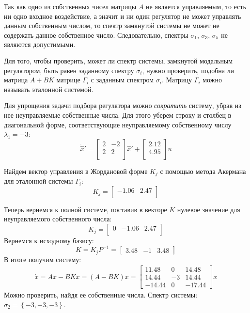 Так как одно из собственных чисел матрицы $A$ не является управляемым, то есть ни одно входное воздействие, а значит и ни один регулятор 
не может управлять данным собственным числом, то спектр замкнутой системы не может не содержать данное собственное число. 
Следовательно, спектры $\sigma_1$, $\sigma_3$, $\sigma_5$ не являются допустимыми.

Для того, чтобы проверить, может ли спектр системы, замкнутой модальным регулятором, быть равен заданному спектру $\sigma_i$, 
нужно проверить, подобна ли матрица $A + BK$ матрице $\Gamma_i$ с заданным спектром $\sigma_i$.
Матрицу $\Gamma_i$ можно называть эталонной системой.

Для упрощения задачи подбора регулятора можно \textit{сократить} систему, убрав из нее неуправляемые собственные числа. 
Для этого уберем строку и столбец в диагональной форме, соответствующие неуправляемому собственному числу $\lambda_1 = -3$:
\begin{equation}
    \dot{\hat{x}}' =
     \begin{bmatrix}
        2  & -2 \\ 
        2  & 2 \\
    \end{bmatrix} \hat{x}' + 
    \begin{bmatrix}
        2.12 \\ 
        4.95 \\ 
    \end{bmatrix}u
\end{equation}

Найдем вектор управления в Жордановой форме $K_j$ с помощью метода Акермана для эталонной системы $\Gamma_i$: 
\begin{equation}
    K_j = \begin{bmatrix}
        -1.06  & 2.47 \\ 
    \end{bmatrix}
\end{equation}

Теперь вернемся к полной системе, поставив в векторе $K$ нулевое значение для неуправляемого собственного числа: 
\begin{equation}
    K_j = \begin{bmatrix}
        0  & -1.06  & 2.47 \\ 
    \end{bmatrix}
\end{equation}
Вернемся к исходному базису:
\begin{equation}
    K = K_jP^{-1} = \begin{bmatrix}
        3.48 & -1 & 3.48
    \end{bmatrix}
\end{equation}
В итоге получим систему: 
\begin{eqnarray}
    \dot{x} = Ax - BKx = (A - BK)x = \begin{bmatrix}
        11.48 & 0 & 14.48 \\
    14.44 & -3 & 14.44 \\
    -14.44 & 0 & -17.44
    \end{bmatrix} x
\end{eqnarray}
Можно проверить, найдя ее собственные числа. Спектр системы: $\sigma_2 = \left\{ -3, -3, -3 \right\}$.

